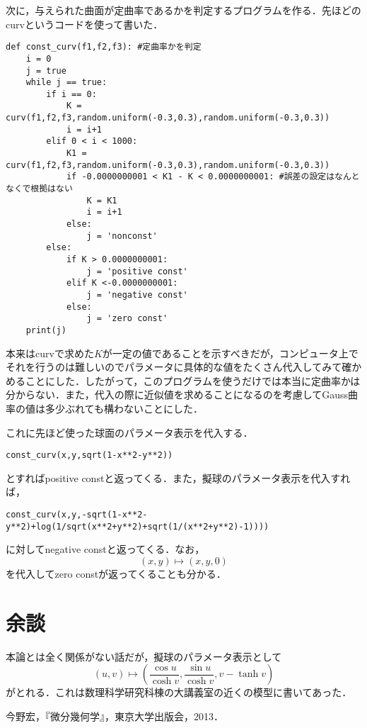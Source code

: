 \documentclass{jsarticle}
\theoremstyle{definition}
\begin{document}
次に，与えられた曲面が定曲率であるかを判定するプログラムを作る．先ほどのcurvというコードを使って書いた．
\begin{lstlisting}[basicstyle=\ttfamily\footnotesize, frame=single]
def const_curv(f1,f2,f3): #定曲率かを判定
    i = 0
    j = true
    while j == true:
        if i == 0:
            K = curv(f1,f2,f3,random.uniform(-0.3,0.3),random.uniform(-0.3,0.3))
            i = i+1
        elif 0 < i < 1000:
            K1 = curv(f1,f2,f3,random.uniform(-0.3,0.3),random.uniform(-0.3,0.3))
            if -0.0000000001 < K1 - K < 0.0000000001: #誤差の設定はなんとなくで根拠はない
                K = K1
                i = i+1
            else:
                j = 'nonconst'
        else:
            if K > 0.0000000001:
                j = 'positive const'
            elif K <-0.0000000001:
                j = 'negative const'
            else:
                j = 'zero const' 
    print(j)
\end{lstlisting}
本来はcurvで求めた$K$が一定の値であることを示すべきだが，コンピュータ上でそれを行うのは難しいのでパラメータに具体的な値をたくさん代入してみて確かめることにした．したがって，このプログラムを使うだけでは本当に定曲率かは分からない．また，代入の際に近似値を求めることになるのを考慮してGauss曲率の値は多少ぶれても構わないことにした．

これに先ほど使った球面のパラメータ表示を代入する．
\begin{lstlisting}[basicstyle=\ttfamily\footnotesize, frame=single]
const_curv(x,y,sqrt(1-x**2-y**2))
\end{lstlisting}
とすればpositive constと返ってくる．また，擬球のパラメータ表示を代入すれば，
\begin{lstlisting}[basicstyle=\ttfamily\footnotesize, frame=single]
const_curv(x,y,-sqrt(1-x**2-y**2)+log(1/sqrt(x**2+y**2)+sqrt(1/(x**2+y**2)-1))))
\end{lstlisting} 
に対してnegative constと返ってくる．なお，
\[ (x,y)\mapsto (x,y,0) \]
を代入してzero constが返ってくることも分かる．
\section{余談}
本論とは全く関係がない話だが，擬球のパラメータ表示として
\[ (u,v)\mapsto \left(\frac{\cos u}{\cosh v},\frac{\sin u}{\cosh v},v-\tanh v\right) \]
がとれる．これは数理科学研究科棟の大講義室の近くの模型に書いてあった．
\begin{thebibliography}{9}
 今野宏，『微分幾何学』，東京大学出版会，2013．
\end{thebibliography}
\end{document}

